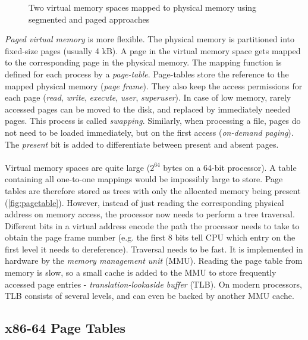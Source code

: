 \begin{figure}
  \caption{Two virtual memory spaces mapped to physical memory using segmented
  and paged approaches}
\end{figure}

\emph{Paged virtual memory} is more flexible. The physical memory is partitioned
into fixed-size pages (usually 4 kB). A page in the virtual memory space gets
mapped to the corresponding page in the physical memory. The mapping function is
defined for each process by a \emph{page-table}. Page-tables store the reference
to the mapped physical memory (\emph{page frame}). They also keep
the access permissions for each page (\emph{read}, \emph{write}, \emph{execute},
 \emph{user}, \emph{superuser}). In case of low memory, rarely accessed pages 
can be moved to the disk, and replaced by immediately needed pages. This process
is called \emph{swapping}. Similarly, when processing a file, pages do not need 
to be loaded immediately, but on the first access (\emph{on-demand paging}). The
\emph{present} bit is added to differentiate between present and absent pages.
\\
\\
Virtual memory spaces are quite large ($2^{64}$ bytes on a 64-bit processor). A 
table containing all one-to-one mappings would be impossibly large to store. 
Page tables are therefore stored as trees with only the allocated memory being 
present (\cref{fig:pagetable}). However, instead of just reading the 
corresponding physical address on memory access, the processor now needs to 
perform a tree traversal. Different bits in a virtual address encode the path 
the processor needs to take to obtain the page frame number (e.g. the first 8 
bits tell CPU which entry on the first level it needs to dereference). Traversal
needs to be fast. It is implemented in hardware by the \emph{memory management 
unit} (MMU). Reading the page table from memory is slow, so a small cache is 
added to the MMU to store frequently accessed page entries - 
\emph{translation-lookaside buffer} (TLB). On modern processors, TLB consists of
several levels, and can even be backed by another MMU cache. 

\subsection{x86-64 Page Tables}

